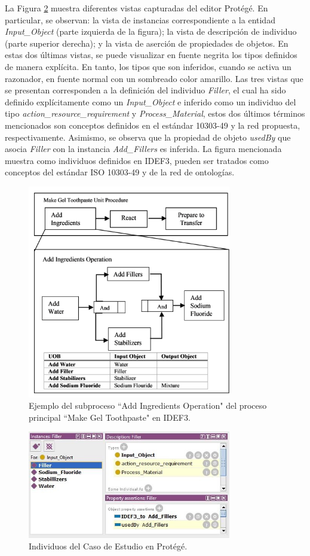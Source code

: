 \documentclass[journal]{IEEEtran}
\begin{document}
La Figura \ref{fig11} muestra diferentes vistas capturadas del editor Prot\'eg\'e. En particular, se observan: la vista de instancias correspondiente a la entidad \emph{Input\_Object} (parte izquierda de la figura); la vista de descripci\'on de individuo (parte superior derecha); y la vista de aserci\'on de propiedades de objetos. En estas dos \'ultimas vistas, se puede visualizar en fuente negrita los tipos definidos de manera expl\'icita. En tanto, los tipos que son inferidos, cuando se activa un razonador, en fuente normal con un sombreado color amarillo.  Las tres vistas que se presentan corresponden a la definici\'on del individuo \emph{Filler}, el cual ha sido definido expl\'icitamente como un \emph{Input\_Object} e inferido como un individuo del tipo \emph{action\_resource\_requirement} y \emph{Process\_Material}, estos dos \'ultimos t\'erminos mencionados son conceptos definidos en el est\'andar 10303-49 y la red propuesta, respectivamente. Asimismo, se observa que la propiedad de objeto \emph{usedBy} que asocia \emph{Filler} con la instancia \emph{Add\_Fillers} es inferida. La figura mencionada muestra como individuos definidos en IDEF3, pueden ser tratados como conceptos del est\'andar ISO 10303-49 y de la red de ontolog\'ias.


\begin{figure}[!t]
\centering
\includegraphics[width=3.5in]{figures/figure10.png}
\caption{Ejemplo del subproceso ``Add Ingredients Operation" del proceso principal ``Make Gel Toothpaste" en IDEF3.}
\label{fig10}
\end{figure}

\begin{figure}[!t]
\centering
\includegraphics[width=3.5in]{figures/figure11.jpg}
\caption{Individuos del Caso de Estudio en Prot\'eg\'e.}
\label{fig11}
\end{figure}
\end{document}
